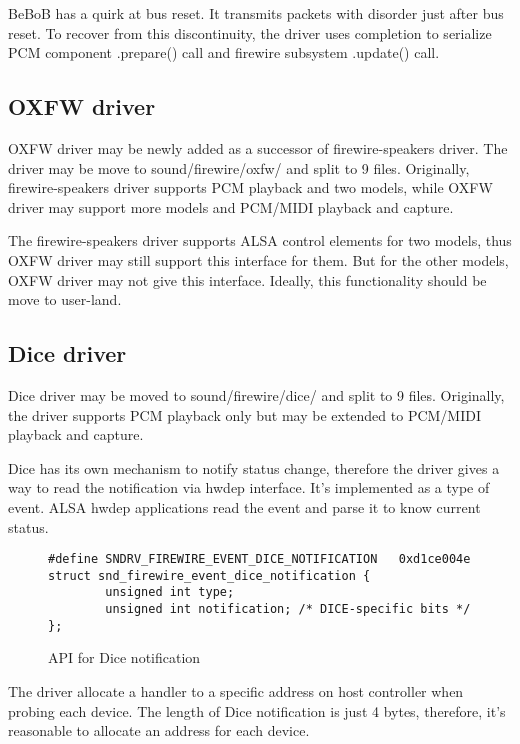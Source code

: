 \documentclass[onecolumn]{jarticle}
\begin{document}
BeBoB has a quirk at bus reset. It transmits packets with disorder just after bus reset. To recover from this discontinuity, the driver uses completion to serialize PCM component .prepare() call and firewire subsystem .update() call.

\subsection{OXFW driver}

OXFW driver may be newly added as a successor of firewire-speakers driver. The driver may be move to sound/firewire/oxfw/ and split to 9 files. Originally, firewire-speakers driver supports PCM playback and two models, while OXFW driver may support more models and PCM/MIDI playback and capture.

The firewire-speakers driver supports ALSA control elements for two models, thus OXFW driver may still support this interface for them. But for the other models, OXFW driver may not give this interface. Ideally, this functionality should be move to user-land.

\subsection{Dice driver}

Dice driver may be moved to sound/firewire/dice/ and split to 9 files. Originally, the driver supports PCM playback only but may be extended to PCM/MIDI playback and capture.

Dice has its own mechanism to notify status change, therefore the driver gives a way to read the notification via hwdep interface. It's implemented as a type of event. ALSA hwdep applications read the event and parse it to know current status.

\begin{figure}[H]
\small
\begin{verbatim}
#define SNDRV_FIREWIRE_EVENT_DICE_NOTIFICATION   0xd1ce004e
struct snd_firewire_event_dice_notification {
        unsigned int type;
        unsigned int notification; /* DICE-specific bits */
};
\end{verbatim}
\caption{API for Dice notification}
\label{uapi-dice-notification}
\end{figure}

The driver allocate a handler to a specific address on host controller when probing each device. The length of Dice notification is just 4 bytes, therefore, it's reasonable to allocate an address for each device.
\end{document}
